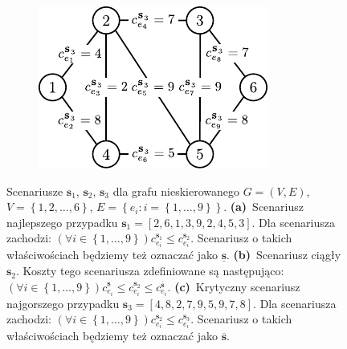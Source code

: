 \begin{figure}[!htbp]
\begin{subfigure}[b]{0.32\textwidth}
		\includegraphics[width=\textwidth]{Chapter_II/SCENARIO-example/c}
		\caption{}
		\label{fig:scenarioExample:c}
	\end{subfigure}
	\hfill\null
	\caption{
		Scenariusze $\textbf{s}_{1}$, $\textbf{s}_{2}$, $\textbf{s}_{3}$ dla grafu nieskierowanego $G = \left( V, E \right)$, $V = \left\{ 1, 2, \dots, 6 \right\}$, $E = \left\{ e_{i} : i = \left\{ 1, \dots, 9 \right\} \right\}$.
		\textbf{(a)}~Scenariusz najlepszego przypadku $\textbf{s}_{1} = \left[ 2, 6, 1, 3, 9, 2, 4, 5, 3 \right]$. Dla scenariusza zachodzi: $\left( \forall i \in \left\{ 1, \dots, 9 \right\} \right) c^{\textbf{s}_{1}}_{e_{i}} \leqslant c^{\textbf{s}_{2}}_{e_{i}}$. Scenariusz o takich właściwościach będziemy też oznaczać jako $\underline{\textbf{s}}$.
		\textbf{(b)}~Scenariusz ciągły $\textbf{s}_{2}$. Koszty tego scenariusza zdefiniowane są następująco: $\left( \forall i \in \left\{ 1, \dots, 9 \right\} \right) c^{\underline{\textbf{s}}}_{e_{i}} \leqslant c^{\textbf{s}_{2}}_{e_{i}} \leqslant c^{\overline{\textbf{s}}}_{e_{i}}$.
		\textbf{(c)}~Krytyczny scenariusz najgorszego przypadku $\textbf{s}_{3} = \left[ 4, 8, 2, 7, 9, 5, 9, 7, 8 \right]$. Dla scenariusza zachodzi: $\left( \forall i \in \left\{ 1, \dots, 9 \right\} \right) c^{\textbf{s}_{2}}_{e_{i}} \leqslant c^{\textbf{s}_{3}}_{e_{i}}$. Scenariusz o takich właściwościach będziemy też oznaczać jako $\overline{\textbf{s}}$.
	}
	\label{fig:scenarioExample}
\end{figure}

